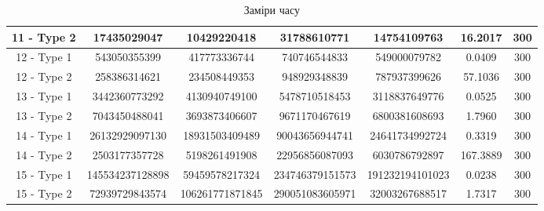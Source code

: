 \documentclass[a4paper,12pt]{article}
\begin{document}
\begin{table}[htp]
\begin{adjustwidth}{-5cm}{}
\begin{tabular}{||c|c|c|c|c|c|c||}
11 - Type 2 & 17435029047 & 10429220418 & 31788610771 & 14754109763 & 16.2017 & 300 \\ \hline
12 - Type 1 & 543050355399 & 417773336744 & 740746544833 & 549000079782 & 0.0409 & 300 \\ \hline
12 - Type 2 & 258386314621 & 234508449353 & 948929348839 & 787937399626 & 57.1036 & 300 \\ \hline
13 - Type 1 & 3442360773292 & 4130940749100 & 5478710518453 & 3118837649776 & 0.0525 & 300 \\ \hline
13 - Type 2 & 7043450488041 & 3693873406607 & 9671170467619 & 6800381608693 & 1.7960 & 300 \\ \hline
14 - Type 1 & 26132929097130 & 18931503409489 & 90043656944741 & 24641734992724 & 0.3319 & 300 \\ \hline
14 - Type 2 & 2503177357728 & 5198261491908 & 22956856087093 & 6030786792897 & 167.3889 & 300 \\ \hline
15 - Type 1 & 145534237128898 & 59459578217324 & 234746379151573 & 191232194101023 & 0.0238 & 300 \\ \hline
15 - Type 2 & 72939729843574 & 106261771871845 & 290051083605971 & 32003267688517 & 1.7317 & 300\\ \hline
\end{tabular}
\end{adjustwidth}
\caption{Заміри часу}\label{fig:time}
\end{table}
\end{document}
